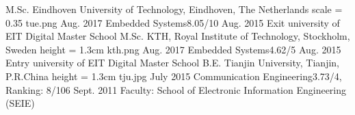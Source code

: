 %
%
%
%
%
% 
\begin{educations}
	\education
    {M.Sc.}			{Eindhoven University of Technology, Eindhoven, The Netherlands}
    {scale = 0.35}			{tue.png}
    {Aug. 2017}		{Embedded Systems}{8.05/10}
    {Aug. 2015}		{Exit university of EIT Digital Master School}
    \universitySeparator
    \education
    {M.Sc.}			{KTH, Royal Institute of Technology, Stockholm, Sweden}
    {height = 1.3cm}			{kth.png}
    {Aug. 2017}		{Embedded Systems}{4.62/5}
    {Aug. 2015}		{Entry university of EIT Digital Master School}
    \universitySeparator
    \education
    {B.E.}			{Tianjin University, Tianjin, P.R.China}
    {height = 1.3cm}			{tju.jpg}
    {July 2015}		{Communication Engineering}{3.73/4, Ranking: 8/106}
    {Sept. 2011}	{Faculty: School of Electronic Information Engineering (SEIE)}

\end{educations}